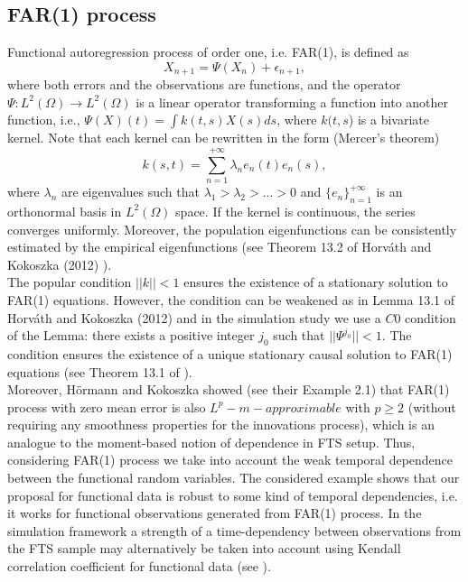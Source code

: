 \documentclass[12pt,a4paper]{article}
\numberwithin{equation}{section}
\begin{document}
\subsection{FAR(1) process}
Functional autoregression process of order one, i.e. FAR(1), is defined as
$$X_{n+1}=\Psi (X_n)+\epsilon_{n+1},$$
where both errors and the observations are functions,
and the operator
\\ $\Psi:L^2(\Omega)\to L^2(\Omega)$ is a linear operator transforming a function into another function, i.e., $\Psi(X)(t)=\int k(t,s)X(s)ds$, where $k(t,s$) is a bivariate kernel. %
Note that each kernel can be rewritten in the form (Mercer's theorem)
\begin{equation}
k(s,t)=\sum_{n=1}^{+\infty}\lambda_n e_n(t)e_n(s),
\end{equation}
where $\lambda_n$ are eigenvalues such that $\lambda_1>\lambda_2>...>0$ and $\{e_n\}_{n=1}^{+\infty}$ is an orthonormal basis in $L^2(\Omega)$ space. 
If the kernel is continuous, the series converges uniformly. Moreover, the population eigenfunctions
can be consistently estimated by the empirical eigenfunctions (see Theorem 13.2 of Horv\'ath and Kokoszka (2012) \cite{Horvath}). 
\\ The popular condition $||k|| < 1$ ensures the existence of a stationary solution to FAR(1) equations. 
However, the condition can be weakened as in Lemma 13.1 of Horv\'ath and Kokoszka (2012) \cite{Horvath} and in the simulation study we use a $C0$ condition of the Lemma: there exists a positive integer $j_0$ such that $||\Psi^{j_0}||<1$. The condition ensures  the existence of
a unique stationary causal solution to FAR(1) equations (see Theorem 13.1 of \cite{Horvath}).
\\ Moreover, H\"ormann and Kokoszka \cite{Hormann} showed (see their Example 2.1) that FAR(1) process with zero mean error is also $L^p-m-approximable$ with $p\geq 2$ (without requiring any smoothness properties for the innovations process), which is an analogue to the moment-based notion
of dependence in FTS setup. Thus, considering FAR(1) process we take into account the weak temporal dependence between the functional random variables. The considered example shows that our proposal for functional data is robust to some kind of temporal dependencies, i.e. it works for functional observations generated from FAR(1) process.
In the simulation framework a strength of a time-dependency between observations from the FTS sample may alternatively be taken into account using Kendall correlation coefficient for functional data (see \cite{kendal}).
\end{document}
